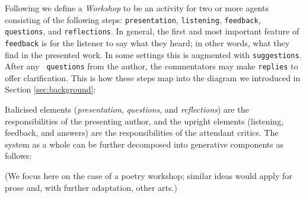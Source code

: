 


Following 
we define a \emph{Workshop} to be an activity for two or more agents
consisting of the following steps:
{\tt presentation}, {\tt listening}, {\tt feedback}, {\tt questions},
and {\tt reflections}.  In general, the first and most important
feature of {\tt feedback} is for the listener to say what they heard;
in other words, what they find in the presented work.  In some
settings this is augmented with {\tt suggestions}.  After any {\tt
  questions} from the author, the commentators may make {\tt replies}
to offer clarification.  This is how these steps map into the diagram
we introduced in Section \ref{sec:background}:



Italicised elements (\emph{presentation}, \emph{questions}, and
\emph{reflections}) are the responsibilities of the presenting author,
and the upright elements (listening, feedback, and
answers) are the responsibilities of the attendant critics.
%
The system as a whole can be further decomposed into generative
components as follows:

\bigskip



\bigskip

\noindent (We focus here on the case of a poetry workshop; similar
ideas would apply for prose and, with further adaptation, other arts.)

